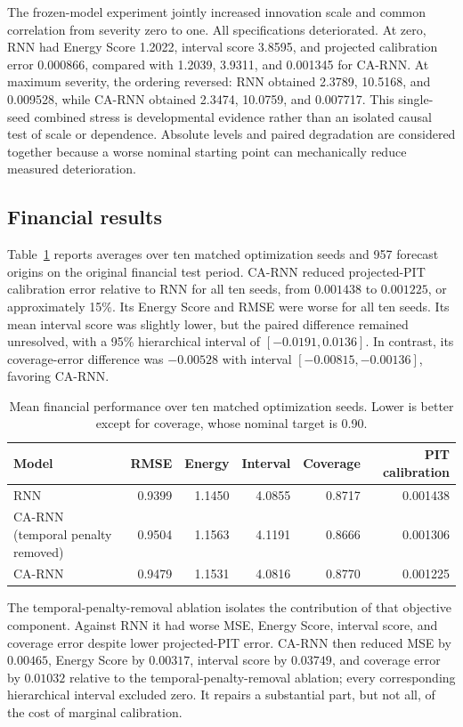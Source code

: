 \documentclass[11pt]{article}
\begin{document}
The frozen-model experiment jointly increased innovation scale and common
correlation from severity zero to one. All specifications deteriorated. At zero,
RNN had Energy Score 1.2022, interval score 3.8595, and projected calibration
error 0.000866, compared with 1.2039, 3.9311, and 0.001345 for CA-RNN.
At maximum severity, the ordering reversed: RNN obtained 2.3789, 10.5168, and
0.009528, while CA-RNN obtained 2.3474, 10.0759, and 0.007717. This
single-seed combined stress is developmental evidence rather than an isolated
causal test of scale or dependence. Absolute levels and paired degradation are
considered together because a worse nominal starting point can mechanically
reduce measured deterioration.

\subsection{Financial results}

Table~\ref{tab:seed-results} reports averages over ten matched optimization seeds
and 957 forecast origins on the original financial test period. CA-RNN
reduced projected-PIT calibration error relative to RNN for all ten seeds, from
$0.001438$ to $0.001225$, or approximately 15\%. Its Energy Score and RMSE were
worse for all ten seeds. Its mean interval score was slightly lower, but the
paired difference remained unresolved, with a 95\% hierarchical interval of
$[-0.0191,0.0136]$. In contrast, its coverage-error difference was $-0.00528$
with interval $[-0.00815,-0.00136]$, favoring CA-RNN.

\begin{table}[ht]
\centering
\caption{Mean financial performance over ten matched optimization seeds. Lower
is better except for coverage, whose nominal target is 0.90.}
\label{tab:seed-results}
\begin{tabular}{lrrrrr}
\toprule
Model & RMSE & Energy & Interval & Coverage & PIT calibration \\
\midrule
RNN & 0.9399 & 1.1450 & 4.0855 & 0.8717 & 0.001438 \\
CA-RNN (temporal penalty removed) & 0.9504 & 1.1563 & 4.1191 & 0.8666 & 0.001306 \\
CA-RNN & 0.9479 & 1.1531 & 4.0816 & 0.8770 & 0.001225 \\
\bottomrule
\end{tabular}
\end{table}

The temporal-penalty-removal ablation isolates the contribution of that objective
component. Against RNN it had worse MSE,
Energy Score, interval score, and coverage error despite lower projected-PIT
error. CA-RNN then reduced MSE by $0.00465$, Energy Score by
$0.00317$, interval score by $0.03749$, and coverage error by $0.01032$ relative
to the temporal-penalty-removal ablation; every corresponding hierarchical
interval excluded zero. It repairs a
substantial part, but not all, of the cost of marginal calibration.
\end{document}
